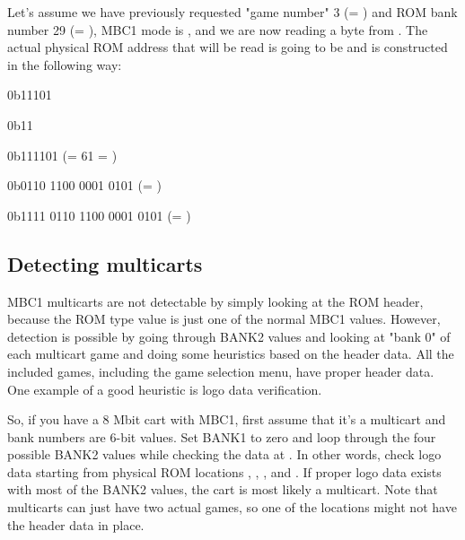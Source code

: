 Let's assume we have previously requested "game number" 3 (= )
and ROM bank number 29 (= ), MBC1 mode is , and we are
now reading a byte from . The actual physical ROM address that
will be read is going to be  and is constructed in the
following way:

\begin{description}[leftmargin=15em,style=nextline]
  \item[Value of the BANK1 register]
  {
    \ttfamily
    0b\colorbox{gray!10}{1}\colorbox{blue!30}{1101}
  }
  \item[Value of the BANK2 register]
  {
    \ttfamily
    0b\colorbox{red!30}{11}
  }
  \item[ROM bank number]
  {
    \ttfamily
    0b\colorbox{red!30}{11}\colorbox{blue!30}{1101} (= 61 = )
  }
  \item[Address being read]
  {
    \ttfamily
    0b\colorbox{gray!10}{01}\colorbox{green!30}{10 1100 0001 0101} (= )
  }
  \item[Actual physical ROM address]
  {
    \ttfamily
    0b\colorbox{red!30}{11}\colorbox{blue!30}{11 01}\colorbox{green!30}{10 1100 0001 0101} (= )
  }
\end{description}

\subsection{Detecting multicarts}

MBC1 multicarts are not detectable by simply looking at the ROM header, because
the ROM type value is just one of the normal MBC1 values. However, detection is
possible by going through BANK2 values and looking at "bank 0" of each
multicart game and doing some heuristics based on the header data. All the
included games, including the game selection menu, have proper header data.
One example of a good heuristic is logo data verification.

So, if you have a 8 Mbit cart with MBC1, first assume that it's a multicart and
bank numbers are 6-bit values. Set BANK1 to zero and loop through the four
possible BANK2 values while checking the data at . In
other words, check logo data starting from physical ROM locations ,
, , and . If proper logo data exists with most
of the BANK2 values, the cart is most likely a multicart. Note that multicarts
can just have two actual games, so one of the locations might not have the
header data in place.


